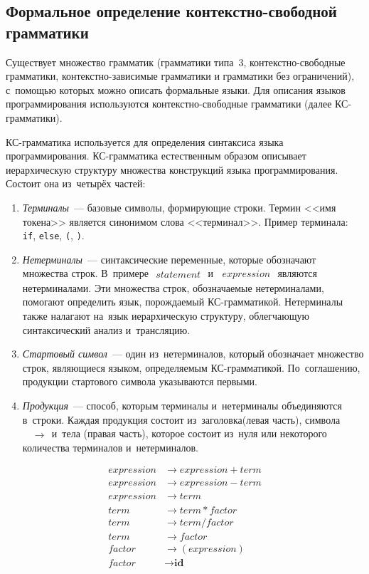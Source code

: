 \subsection{Формальное определение контекстно-свободной грамматики} \label{sub114}

Существует множество грамматик (грамматики типа~3, контекстно-свободные грамматики, контекстно-зависимые грамматики и грамматики без ограничений), с~помощью которых можно описать формальные языки. Для описания языков программирования используются контекстно-свободные грамматики  (далее КС-грамматики).

КС-грамматика используется для определения синтаксиса языка программирования. КС-грамматика естественным образом описывает иерархическую структуру множества конструкций языка программирования. Состоит она из~четырёх частей:

\begin{enumerate} 
	\item{\textit{Терминалы}~--- базовые символы, формирующие строки. Термин <<имя токена>> является синонимом слова <<терминал>>. Пример терминала: \texttt{if}, \texttt{else}, \texttt{(}, \texttt{)}}.
	\item{\textit{Нетерминалы}~--- синтаксические переменные, которые обозначают множества строк. В~примере $\begin{aligned} statement \end{aligned}$ и~$\begin{aligned} expression \end{aligned}$ являются нетерминалами. Эти множества строк, обозначаемые нетерминалами, помогают определить язык, порождаемый КС-грамматикой. Нетерминалы также налагают на~язык иерархическую структуру, облегчающую синтаксический анализ и~трансляцию.}
	\item{\textit{Стартовый символ}~--- один из~нетерминалов, который обозначает множество строк, являющиеся языком, определяемым КС-грамматикой. По~соглашению, продукции стартового символа указываются первыми.}
	\item{\textit{Продукция}~--- способ, которым терминалы и~нетерминалы объединяются в~строки. Каждая продукция состоит из~заголовка(левая часть), символа $\begin{aligned} &\to \end{aligned}$ и~тела (правая часть), которое состоит из~нуля или некоторого количества терминалов и~нетерминалов.}
\end{enumerate}
\begin{align*}
expression &\to expression + term \\
expression &\to expression - term \\
expression &\to term \\
term &\to term * factor \\
term &\to term / factor \\ 
term &\to factor \\
factor &\to (expression) \\
factor &\to \textbf{id}
\end{align*}